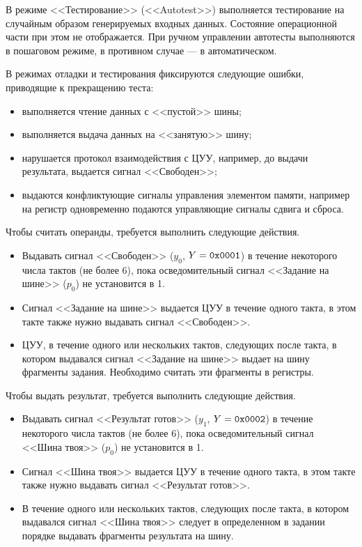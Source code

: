 В режиме <<Тестирование>> (<<Autotest>>) выполняется тестирование на случайным образом генерируемых входных данных. Состояние операционной части при этом не отображается. При ручном управлении автотесты выполняются в пошаговом режиме, в противном случае --- в автоматическом.

В режимах отладки и тестирования фиксируются следующие ошибки, приводящие к прекращению теста:
\begin{itemize}
    \item выполняется чтение данных с <<пустой>> шины;
    \item выполняется выдача данных на <<занятую>> шину;
    \item нарушается протокол взаимодействия с ЦУУ, например, до выдачи результата, выдается сигнал <<Свободен>>;
    \item выдаются конфликтующие сигналы управления элементом памяти, например на регистр одновременно подаются управляющие сигналы сдвига и сброса.
\end{itemize}

Чтобы считать операнды, требуется выполнить следующие действия.
\begin{itemize}
    \item Выдавать сигнал <<Свободен>> ($y_0$, $Y=\texttt{0x0001}$) в течение некоторого числа тактов (не более 6), пока осведомительный сигнал <<Задание на шине>> ($p_0$) не установится в 1.
    \item Сигнал <<Задание на шине>> выдается ЦУУ в течение одного такта, в этом такте также нужно выдавать сигнал <<Свободен>>.
    \item ЦУУ, в течение одного или нескольких тактов, следующих после такта, в котором выдавался сигнал <<Задание на шине>> выдает на шину фрагменты задания. Необходимо считать эти фрагменты в регистры.
\end{itemize}

Чтобы выдать результат, требуется выполнить следующие действия.
\begin{itemize}
    \item Выдавать сигнал <<Результат готов>> ($y_1$, $Y=\texttt{0x0002}$) в течение некоторого числа тактов (не более 6), пока осведомительный сигнал <<Шина твоя>> ($p_0$) не установится в 1.
    \item Сигнал <<Шина твоя>> выдается ЦУУ в течение одного такта, в этом такте также нужно выдавать сигнал <<Результат готов>>.
    \item В течение одного или нескольких тактов, следующих после такта, в котором выдавался сигнал <<Шина твоя>> следует в определенном в задании порядке выдавать фрагменты результата на шину.
\end{itemize}


